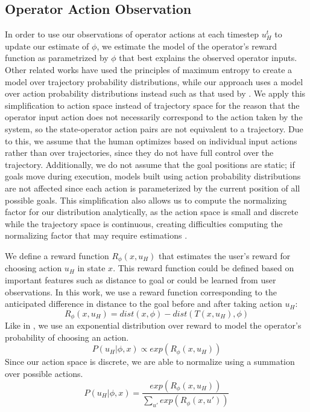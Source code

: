\documentclass[conference]{IEEEtran}
\begin{document}
\subsection{Operator Action Observation}
In order to use our observations of operator actions at each timestep $u_H^t$ to update our estimate of $\phi$, we estimate the model of the operator's reward function as parametrized by $\phi$ that best explains the observed operator inputs. Other related works \cite{dragan2012formalizing, javdani2015shared} have used the principles of maximum entropy \cite{ziebart2008maximum} to create a model over trajectory probability distributions, while our approach uses a model over action probability distributions instead such as that used by \citet{ramachandran2007bayesian}. We apply this simplification to action space instead of trajectory space for the reason that the operator input action does not necessarily correspond to the action taken by the system, so the state-operator action pairs are not equivalent to a trajectory. Due to this, we assume that the human optimizes based on individual input actions rather than over trajectories, since they do not have full control over the trajectory. Additionally, we do not assume that the goal positions are static; if goals move during execution, models built using action probability distributions are not affected since each action is parameterized by the current position of all possible goals. This simplification also allows us to compute the normalizing factor for our distribution analytically, as the action space is small and discrete while the trajectory space is continuous, creating difficulties computing the normalizing factor that may require estimations \cite{javdani2015shared}.

We define a reward function $R_\phi (x, u_H)$ that estimates the user's reward for choosing action $u_H$ in state $x$. This reward function could be defined based on important features such as distance to goal or could be learned from user observations. In this work, we use a reward function corresponding to the anticipated difference in distance to the goal before and after taking action $u_H$: 
\[
R_\phi (x, u_H) = dist(x, \phi) - dist(T(x, u_H), \phi)
\]
Like in \cite{ramachandran2007bayesian}, we use an exponential distribution over reward to model the operator's probability of choosing an action.
\[
P(u_H|\phi, x) \propto exp(R_\phi (x, u_H))
\]
Since our action space is discrete, we are able to normalize using a summation over possible actions.
\[
P(u_H|\phi, x) = \frac{exp(R_\phi (x, u_H))}{\sum_{u'} exp(R_\phi (x, u'))}
\]
\end{document}
